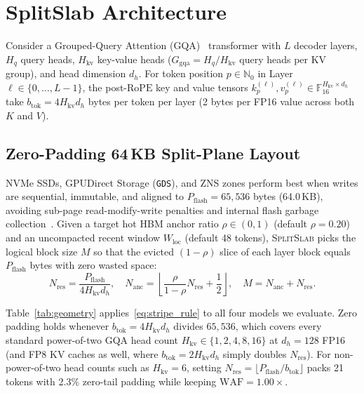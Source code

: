\documentclass[pdflatex,sn-mathphys-num]{sn-jnl}
\theoremstyle{thmstyleone}
\newcommand{\SplitSlab}{\textsc{SplitSlab}}
\newcommand{\RoPE}{\mathrm{RoPE}}
\newcommand{\WAF}{\mathrm{WAF}}
\begin{document}
\section{SplitSlab Architecture}\label{sec:arch}

Consider a Grouped-Query Attention (GQA)~\cite{ainslie2023gqa} transformer with $L$ decoder layers, $H_q$ query heads, $H_{\mathrm{kv}}$ key-value heads ($G_{\mathrm{gqa}} = H_q / H_{\mathrm{kv}}$ query heads per KV group), and head dimension $d_h$. For token position $p \in \mathbb{N}_0$ in Layer~$\ell \in \{0,\dots,L-1\}$, the post-$\RoPE$ key and value tensors $k_p^{(\ell)}, v_p^{(\ell)} \in \mathbb{F}_{16}^{H_{\mathrm{kv}} \times d_h}$ take $b_{\mathrm{tok}} = 4 H_{\mathrm{kv}} d_h$ bytes per token per layer (2 bytes per FP16 value across both $K$ and $V$).

\subsection{Zero-Padding 64\,KB Split-Plane Layout}\label{subsec:layout}

NVMe SSDs, GPUDirect Storage (\texttt{GDS}), and ZNS zones perform best when writes are sequential, immutable, and aligned to $P_{\mathrm{flash}} = 65{,}536$ bytes (64.0\,KB), avoiding sub-page read-modify-write penalties and internal flash garbage collection~\cite{hu2009waf,bjorling2021zns}. Given a target hot HBM anchor ratio $\rho \in (0,1)$ (default $\rho = 0.20$) and an uncompacted recent window $W_{\mathrm{loc}}$ (default 48 tokens), \SplitSlab{} picks the logical block size $M$ so that the evicted $(1-\rho)$ slice of each layer block equals $P_{\mathrm{flash}}$ bytes with zero wasted space:
\begin{equation}\label{eq:stripe_rule}
N_{\mathrm{res}} = \frac{P_{\mathrm{flash}}}{4 H_{\mathrm{kv}} d_h}, \quad
N_{\mathrm{anc}} = \left\lfloor \frac{\rho}{1-\rho} N_{\mathrm{res}} + \frac{1}{2} \right\rfloor, \quad
M = N_{\mathrm{anc}} + N_{\mathrm{res}}.
\end{equation}

Table~\ref{tab:geometry} applies~\eqref{eq:stripe_rule} to all four models we evaluate. Zero padding holds whenever $b_{\mathrm{tok}} = 4 H_{\mathrm{kv}} d_h$ divides $65{,}536$, which covers every standard power-of-two GQA head count $H_{\mathrm{kv}} \in \{1, 2, 4, 8, 16\}$ at $d_h = 128$ FP16 (and FP8 KV caches as well, where $b_{\mathrm{tok}} = 2 H_{\mathrm{kv}} d_h$ simply doubles $N_{\mathrm{res}}$). For non-power-of-two head counts such as $H_{\mathrm{kv}} = 6$, setting $N_{\mathrm{res}} = \lfloor P_{\mathrm{flash}} / b_{\mathrm{tok}} \rfloor$ packs 21 tokens with 2.3\% zero-tail padding while keeping $\WAF = 1.00\times$.
\end{document}
